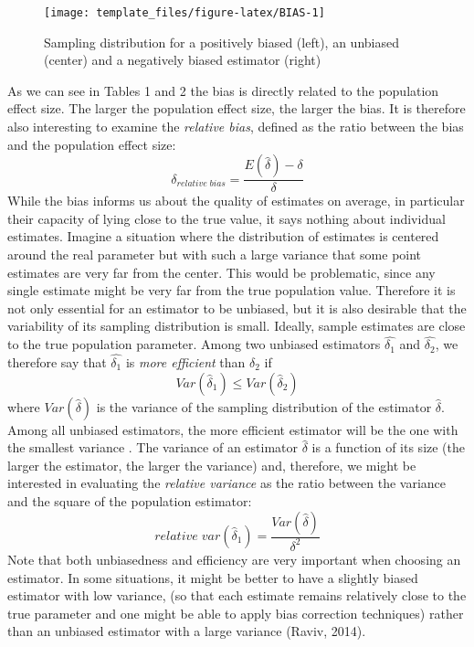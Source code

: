 \documentclass[
  12pt,
  french,
]{article}
\begin{document}
\begin{figure}
\texttt{[image: template\_files/figure-latex/BIAS-1]} \caption{Sampling distribution for a positively biased (left), an unbiased (center) and a negatively biased estimator (right)}\label{fig:BIAS}
\end{figure}

As we can see in Tables 1 and 2 the bias is directly related to the
population effect size. The larger the population effect size, the
larger the bias. It is therefore also interesting to examine the
\emph{relative bias}, defined as the ratio between the bias and the
population effect size: \begin{equation} 
\delta_{relative \; bias}=\frac{E(\hat{\delta})-\delta}{\delta}
\label{eqn:RELBIAS}
\end{equation} While the bias informs us about the quality of estimates
on average, in particular their capacity of lying close to the true
value, it says nothing about individual estimates. Imagine a situation
where the distribution of estimates is centered around the real
parameter but with such a large variance that some point estimates are
very far from the center. This would be problematic, since any single
estimate might be very far from the true population value. Therefore it
is not only essential for an estimator to be unbiased, but it is also
desirable that the variability of its sampling distribution is small.
Ideally, sample estimates are close to the true population parameter.
Among two unbiased estimators \(\hat{\delta_1}\) and \(\hat{\delta_2}\),
we therefore say that \(\hat{\delta_1}\) is \emph{more efficient} than
\(\hat{\delta_2}\) if \begin{equation} 
Var(\hat{\delta}_1) \leq Var(\hat{\delta}_2)
\label{eqn:EFFICIENCY}
\end{equation} where \(Var(\hat{\delta})\) is the variance of the
sampling distribution of the estimator \(\hat{\delta}\). Among all
unbiased estimators, the more efficient estimator will be the one with
the smallest variance
.
The variance of an estimator \(\hat{\delta}\) is a function of its size
(the larger the estimator, the larger the variance) and, therefore, we
might be interested in evaluating the \emph{relative variance} as the
ratio between the variance and the square of the population estimator:
\begin{equation} 
relative \; var(\hat{\delta}_1)=\frac{Var(\hat{\delta})}{\delta^2}
\label{eqn:RELVAR}
\end{equation} Note that both unbiasedness and efficiency are very
important when choosing an estimator. In some situations, it might be
better to have a slightly biased estimator with low variance, (so that
each estimate remains relatively close to the true parameter and one
might be able to apply bias correction techniques) rather than an
unbiased estimator with a large variance (Raviv, 2014).
\end{document}
